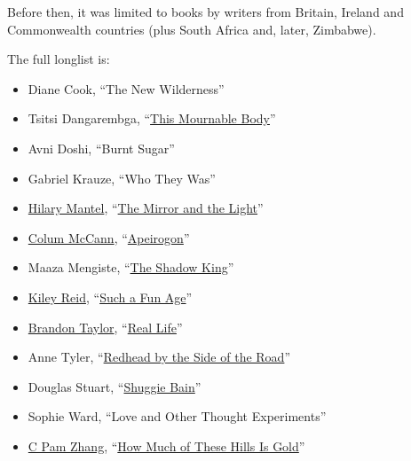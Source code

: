 Before then, it was limited to books by writers from Britain, Ireland
and Commonwealth countries (plus South Africa and, later, Zimbabwe).

The full longlist is:

\begin{itemize}
\item
  Diane Cook, ``The New Wilderness''
\item
  Tsitsi Dangarembga,
  ``\href{https://www.nytimes.com/2018/08/30/books/review/tsitsi-dangarembga-this-mournable-body.html?searchResultPosition=1}{This
  Mournable Body}''
\item
  Avni Doshi, ``Burnt Sugar''
\item
  Gabriel Krauze, ``Who They Was''
\item
  \href{https://www.nytimes.com/2020/02/24/books/hilary-mantel-mirror-and-the-light-thomas-cromwell.html}{Hilary
  Mantel},
  ``\href{https://www.nytimes.com/2020/03/03/books/review-mirror-light-hilary-mantel.html}{The
  Mirror and the Light}''
\item
  \href{https://www.nytimes.com/2020/02/17/books/colum-mccann-apeirogon-israel-palestine.html}{Colum
  McCann},
  ``\href{https://www.nytimes.com/2020/02/19/books/review-apeirogon-colum-mccann.html}{Apeirogon}''
\item
  Maaza Mengiste,
  ``\href{https://www.nytimes.com/2019/09/26/books/review/maaza-mengiste-the-shadow-king.html}{The
  Shadow King}''
\item
  \href{https://www.nytimes.com/2020/01/09/books/review/inside-the-list-kiley-reid.html}{Kiley
  Reid},
  ``\href{https://www.nytimes.com/2019/12/31/books/review/such-a-fun-age-kiley-reid.html}{Such
  a Fun Age}''
\item
  \href{https://www.nytimes.com/2020/02/10/books/brandon-taylor-real-life.html}{Brandon
  Taylor},
  ``\href{https://www.nytimes.com/2020/02/18/books/review/brandon-taylor-real-life.html}{Real
  Life}''
\item
  Anne Tyler,
  ``\href{https://www.nytimes.com/2020/04/07/books/review/redhead-by-the-side-of-the-road-anne-tyler.html}{Redhead
  by the Side of the Road}''
\item
  Douglas Stuart,
  ``\href{https://www.nytimes.com/2020/02/11/books/review/shuggie-bain-douglas-stuart.html}{Shuggie
  Bain}''
\item
  Sophie Ward, ``Love and Other Thought Experiments''
\item
  \href{https://www.nytimes.com/2020/04/04/books/c-pam-zhang-how-much-of-these-hills-is-gold.html}{C
  Pam Zhang},
  ``\href{https://www.nytimes.com/2020/04/07/books/review/how-much-of-these-hills-is-gold-c-pam-zhang.html}{How
  Much of These Hills Is Gold}''
\end{itemize}

